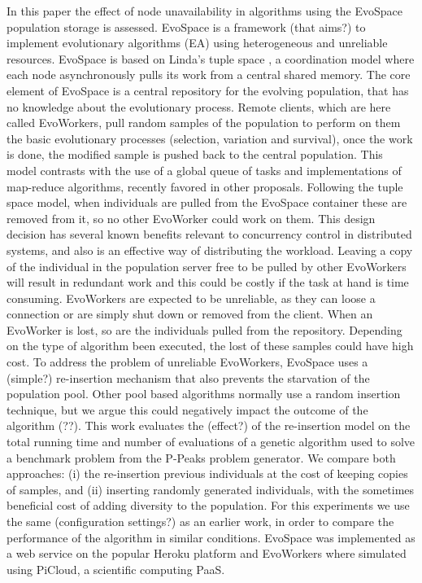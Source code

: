 \documentclass{llncs}
\begin{document}
In this paper the effect of node unavailability in algorithms using the EvoSpace population storage is assessed. EvoSpace \cite{Evospace,FreeLunch}is a framework (that aims?) to implement evolutionary algorithms (EA) using heterogeneous and unreliable resources. EvoSpace is based on Linda's tuple space \cite{Evospace}, a coordination model where each node asynchronously pulls its work from a central shared memory. The core element of EvoSpace is a central repository for the evolving population, that has no knowledge about the evolutionary process. Remote clients, which are here called EvoWorkers, pull random samples of the population to perform on them the basic evolutionary processes (selection, variation and survival), once the work is done, the modified sample is pushed back to the central population. This model contrasts with  the use of a global queue of tasks and implementations of map-reduce algorithms, recently favored in other proposals. Following the tuple space model, when individuals are pulled from the EvoSpace container these are removed from it, so no other EvoWorker could work on them. This design decision has several known benefits relevant to concurrency control in distributed systems, and also is an effective way of distributing the workload. Leaving a copy of the individual in the population server free to be pulled by other EvoWorkers will result in redundant work and this could be costly if the task at hand is time consuming. EvoWorkers are expected to be unreliable, as they can loose a connection or are simply shut down or removed from the client. When an EvoWorker is lost, so are the individuals pulled from the repository. Depending on the type of algorithm been executed, the lost of these samples could have high cost. To address the problem of unreliable EvoWorkers, EvoSpace uses a (simple?) re-insertion mechanism that also prevents the starvation of the population pool. Other pool based algorithms normally use a random insertion technique, but we argue this could negatively impact the outcome of the algorithm (??). This work evaluates the (effect?) of the re-insertion model on the total running time and number of evaluations of a genetic algorithm used to solve a benchmark problem from the P-Peaks problem generator. We compare both approaches: (i) the re-insertion previous individuals at the cost of keeping copies of samples, and (ii) inserting  randomly generated individuals, with the sometimes beneficial cost of adding diversity to the population. For this experiments we use the same (configuration settings?) as an earlier work, in order to compare the performance of the algorithm in similar conditions.
EvoSpace was implemented as a web service on the popular Heroku platform and EvoWorkers where simulated using PiCloud, a scientific computing PaaS. 
\end{document}
